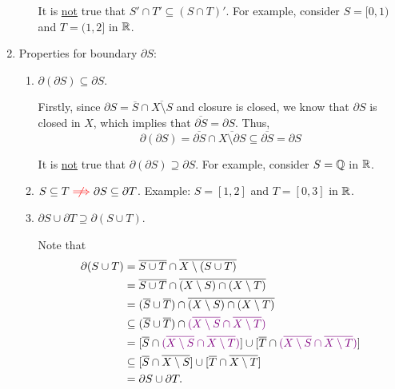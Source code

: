 \begin{enumerate}
\begin{enumerate}
\begin{warning}
It is \underline{not} true that \(S'\cap T'\subseteq (S\cap T)'\). For example, consider
\(S=[0,1)\) and \(T=(1,2]\) in \(\mathbb{R}\).
\end{warning}
\end{enumerate}

\item \label{it:bound-prop}
Properties for boundary \(\partial S\):
\begin{enumerate}
\item \(\partial(\partial S)\subseteq \partial S\).

\begin{pf}
Firstly, since \(\partial S=\overline{S}\cap\overline{X\setminus S}\) and
closure is closed, we know that \(\partial S\) is closed in \(X\), which
implies that \(\overline{\partial S}=\partial S\). Thus,
\[
\partial(\partial S)=\overline{\partial S}\cap\overline{X\setminus \partial S}
\subseteq \overline{\partial S}=\partial S
\]
\end{pf}

\begin{warning}
It is \underline{not} true that \(\partial(\partial S)\supseteq \partial S\). For example, consider
\(S=\mathbb{Q}\) in \(\mathbb{R}\).
\end{warning}

\item \(S\subseteq T\rc{\centernot\implies }\partial S\subseteq \partial T\). Example:
\(S=[1,2]\) and \(T=[0,3]\) in \(\mathbb{R}\).

\item \(\partial S\cup\partial T\supseteq\partial(S\cup T)\).

\begin{pf}
Note that
\begin{align*}
\partial(S\cup T)
&=\overline{S\cup T}\cap\overline{X\setminus (S\cup T)}\\
&=\overline{S\cup T}\cap\overline{(X\setminus S)\cap (X\setminus T)}\\
&=(\overline{S}\cup\overline{T})\cap\overline{(X\setminus S)\cap (X\setminus T)}\\
&\subseteq (\overline{S}\cup\overline{T})\cap{\color{violet}(\overline{X\setminus S}\cap\overline{X\setminus T})}\\
&= [\overline{S}\cap{\color{violet}(\overline{X\setminus S}\cap\overline{X\setminus T})}]\cup
[\overline{T}\cap{\color{violet}(\overline{X\setminus S}\cap\overline{X\setminus T})}]\\
&\subseteq [\overline{S}\cap\overline{X\setminus S}]\cup
[\overline{T}\cap\overline{X\setminus T}]\\
&=\partial S\cup\partial T.
\end{align*}
\end{pf}


\end{enumerate}
\end{enumerate}

